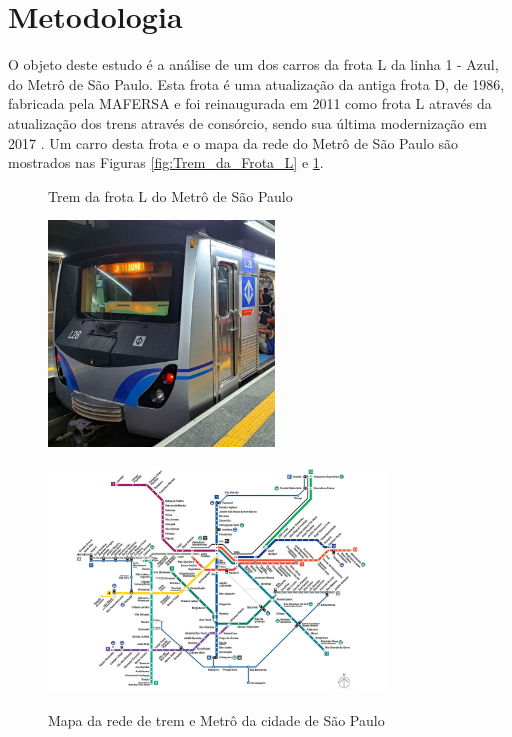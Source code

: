 \documentclass[acronym,symbols,table]{fei}
\begin{document}
\section{Metodologia}

O objeto deste estudo é a análise de um dos carros da frota L da linha 1 - Azul, do Metrô de São Paulo. Esta frota é uma atualização da antiga frota D, de 1986, fabricada pela MAFERSA e foi reinaugurada em 2011 como frota L através da atualização dos trens através de consórcio, sendo sua última modernização em 2017 \cite{Trens_e_frotas}. Um carro desta frota e o mapa da rede do Metrô de São Paulo são mostrados nas Figuras \ref{fig:Trem_da_Frota_L} e \ref{fig:mapa-da-rede-metro-0124-abre}.

\begin{figure}[!htb]
    \centering
    \begin{minipage}{0.45\textwidth}
        \caption{Trem da frota L do Metrô de São Paulo}
        \includegraphics[width=\linewidth, height=6cm]{Imagens/Alstom_L28.jpg}
        \label{fig:Trem_da_Frota_L}
    \end{minipage}\hfill
    \begin{minipage}{0.45\textwidth}
        \caption{Mapa da rede de trem e Metrô da cidade de São Paulo}
        \includegraphics[width=\linewidth, height=6cm]{Imagens/mapa-da-rede-metro-0124-abre.jpg}
        \label{fig:mapa-da-rede-metro-0124-abre}
    \end{minipage}
\end{figure}
\end{document}
